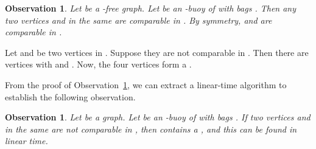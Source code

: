 \documentclass[11pt,a4paper]{article}
\newtheorem{observation}[theorem]{Observation}
\newenvironment{proof}{\noindent {\it Proof:~}}{\hfill \smallskip\par}
\begin{document}
\begin{observation}\label{obs:buoy-square}
Let  be a -free graph. Let  be an -buoy of 
with bags . Then any two vertices  and 
in the same  are comparable in . By symmetry, 
and  are comparable in .
\end{observation}
\begin{proof}
Let  and  be two vertices in . Suppose they are not
comparable in . Then there are vertices 
with  and . Now, the four
vertices  form a .
\end{proof}
From the proof of Observation~\ref{obs:buoy-square}, we can
extract a linear-time algorithm to establish the following
observation.
\begin{observation}\label{obs:find-buoy-square}
Let  be a  graph. Let  be an -buoy of  with bags
 . If two vertices  and  in the same 
are not comparable in , then  contains a , and
this  can be found in linear time. \hfill 
\end{observation}
\end{document}
